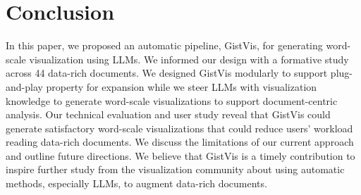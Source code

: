 
\section{Conclusion}
In this paper, we proposed an automatic pipeline, GistVis, for generating word-scale visualization using LLMs. We informed our design with a formative study across 44 data-rich documents. We designed GistVis modularly to support plug-and-play property for expansion while we steer LLMs with visualization knowledge to generate word-scale visualizations to support document-centric analysis. Our technical evaluation and user study reveal that GistVis could generate satisfactory word-scale visualizations that could reduce users' workload reading data-rich documents. We discuss the limitations of our current approach and outline future directions. We believe that GistVis is a timely contribution to inspire further study from the visualization community about using automatic methods, especially LLMs, to augment data-rich documents.

